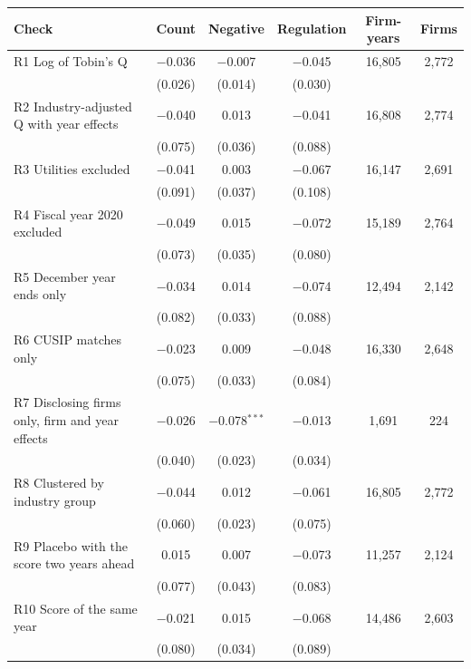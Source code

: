 \begin{tabular}{lccccc}
\toprule
Check & Count & Negative & Regulation & Firm-years & Firms \\
\midrule
R1 Log of Tobin's Q & $-$0.036 & $-$0.007 & $-$0.045 & 16,805 & 2,772 \\
 & (0.026) & (0.014) & (0.030) & & \\
R2 Industry-adjusted Q with year effects & $-$0.040 & 0.013 & $-$0.041 & 16,808 & 2,774 \\
 & (0.075) & (0.036) & (0.088) & & \\
R3 Utilities excluded & $-$0.041 & 0.003 & $-$0.067 & 16,147 & 2,691 \\
 & (0.091) & (0.037) & (0.108) & & \\
R4 Fiscal year 2020 excluded & $-$0.049 & 0.015 & $-$0.072 & 15,189 & 2,764 \\
 & (0.073) & (0.035) & (0.080) & & \\
R5 December year ends only & $-$0.034 & 0.014 & $-$0.074 & 12,494 & 2,142 \\
 & (0.082) & (0.033) & (0.088) & & \\
R6 CUSIP matches only & $-$0.023 & 0.009 & $-$0.048 & 16,330 & 2,648 \\
 & (0.075) & (0.033) & (0.084) & & \\
R7 Disclosing firms only, firm and year effects & $-$0.026 & $-$0.078$^{***}$ & $-$0.013 & 1,691 & 224 \\
 & (0.040) & (0.023) & (0.034) & & \\
R8 Clustered by industry group & $-$0.044 & 0.012 & $-$0.061 & 16,805 & 2,772 \\
 & (0.060) & (0.023) & (0.075) & & \\
R9 Placebo with the score two years ahead & 0.015 & 0.007 & $-$0.073 & 11,257 & 2,124 \\
 & (0.077) & (0.043) & (0.083) & & \\
R10 Score of the same year & $-$0.021 & 0.015 & $-$0.068 & 14,486 & 2,603 \\
 & (0.080) & (0.034) & (0.089) & & \\
\bottomrule
\end{tabular}
